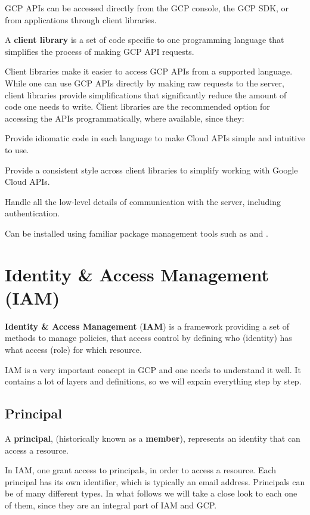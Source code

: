 GCP APIs can be accessed directly from the GCP console, the GCP SDK, or from applications through client libraries.

A \textbf{client library} is a set of code specific to one programming language that simplifies the process of making
GCP API requests.
\ed

Client libraries make it easier to access GCP APIs from a supported language. While one can use GCP APIs directly by
making raw requests to the server, client libraries provide simplifications that significantly reduce the amount of
code one needs to write. \v

Client libraries are the recommended option for accessing the APIs programmatically, where available, since they:
\bit
\item Provide idiomatic code in each language to make Cloud APIs simple and intuitive to use.
\item Provide a consistent style across client libraries to simplify working with Google Cloud APIs.
\item Handle all the low-level details of communication with the server, including authentication.
\item Can be installed using familiar package management tools such as  and .
\eit

\section{Identity \& Access Management (IAM)}

\textbf{Identity \& Access Management} (\textbf{IAM}) is a framework providing a set of methods to manage policies,
that access control by defining who (identity) has what access (role) for which resource.
\ed

IAM is a very important concept in GCP and one needs to understand it well. It contains a lot of layers and definitions,
so we will expain everything step by step.

\subsection{Principal}

\bd[Principal]
A \textbf{principal}, (historically known as a \textbf{member}), represents an identity that can access a resource.
\ed

In IAM, one grant access to principals, in order to access a resource. Each principal has its own identifier, which is
typically an email address. Principals can be of many different types. In what follows we will take a close look to
each one of them, since they are an integral part of IAM and GCP\@.

